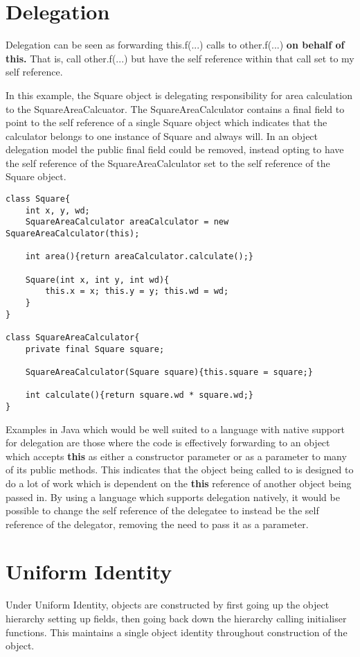\section{Delegation}
Delegation can be seen as forwarding this.f(...) calls to other.f(...) \textbf{on behalf of this.} That is, call other.f(...) but have the self reference within that call set to my self reference.
\newline

In this example, the Square object is delegating responsibility for area calculation to the SquareAreaCalcuator. The SquareAreaCalculator contains a final field to point to the self reference of a single Square object which indicates that the calculator belongs to one instance of Square and always will. In an object delegation model the public final field could be removed, instead opting to have the self reference of the SquareAreaCalculator set to the self reference of the Square object.
\begin{lstlisting}
class Square{
	int x, y, wd;
	SquareAreaCalculator areaCalculator = new SquareAreaCalculator(this);

	int area(){return areaCalculator.calculate();}

	Square(int x, int y, int wd){
		this.x = x; this.y = y; this.wd = wd;
	}
}

class SquareAreaCalculator{
	private final Square square;

	SquareAreaCalculator(Square square){this.square = square;}

	int calculate(){return square.wd * square.wd;}
}
\end{lstlisting}

Examples in Java which would be well suited to a language with native support for delegation are those where the code is effectively forwarding to an object which accepts \textbf{this} as either a constructor parameter or as a parameter to many of its public methods. This indicates that the object being called to is designed to do a lot of work which is dependent on the \textbf{this} reference of another object being passed in. By using a language which supports delegation natively, it would be possible to change the self reference of the delegatee to instead be the self reference of the delegator, removing the need to pass it as a parameter.

\section{Uniform Identity}
Under Uniform Identity, objects are constructed by first going up the object hierarchy setting up fields, then going back down the hierarchy calling initialiser functions. This maintains a single object identity throughout construction of the object.
\newline

